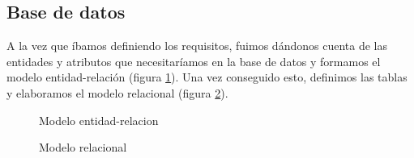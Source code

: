 \subsection{Base de datos}
A la vez que íbamos definiendo los requisitos, fuimos dándonos cuenta de las entidades y atributos que necesitaríamos en la base de datos y formamos el modelo entidad-relación (figura \ref{fig:ent_rel}). Una vez conseguido esto, definimos las tablas y elaboramos el modelo relacional (figura \ref{fig:rel}).

\begin{figure}
\begin{center}
\caption{Modelo entidad-relacion\label{fig:ent_rel}}
\end{center}
\end{figure}

\begin{figure}
\begin{center}
\caption{Modelo relacional\label{fig:rel}}
\end{center}
\end{figure}

